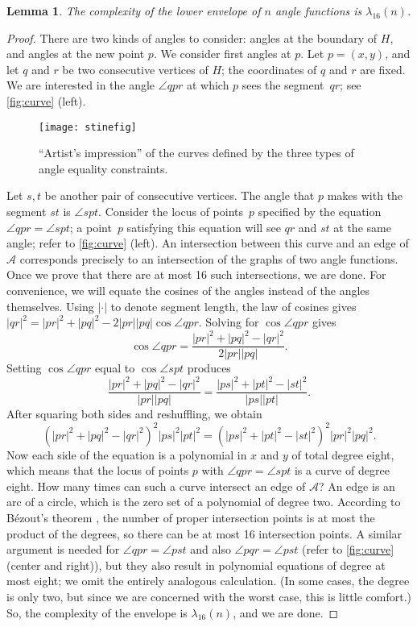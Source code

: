 \documentclass{cccg13}
\newtheorem{lemma}{Lemma}
\newcommand\arr{\mathcal A}
\begin{document}
\begin{lemma} The complexity of the lower envelope of $n$ angle functions is
$\lambda_{16}(n)$. \end{lemma}
\begin{proof} There are two kinds of angles to consider: angles at the boundary of $H$, and angles at the new point $p$.  We consider first angles at $p$.  Let $p=(x,y)$, and let $q$ and $r$ be two consecutive vertices of $H$; the coordinates of $q$ and $r$ are fixed.  We are interested in the angle $\angle qpr$ at which $p$ sees the segment~$qr$; see \autoref{fig:curve} (left). 
\begin{figure}
  \centering
  \texttt{[image: stinefig]}
  \caption{``Artist's impression'' of the curves defined by the three types of angle equality constraints.}
  \label{fig:curve}
\end{figure}
Let $s,t$ be another pair of consecutive vertices.  The angle that $p$ makes with the segment $st$ is $\angle spt$.  Consider the locus of points~$p$ specified by the equation
$\angle qpr = \angle spt$; a point~$p$ satisfying this equation will see $qr$ and $st$ at the same angle; refer to \autoref{fig:curve} (left).  An intersection between this curve and an edge of $\arr$ corresponds precisely to an intersection of the graphs of two angle functions.  Once we prove that there are at most 16 such intersections, we are done.  For convenience, we will equate the cosines of the angles instead of the angles themselves.  Using $|\cdot|$ to denote segment length, the law of cosines gives
$|qr|^2 = |pr|^2 + |pq|^2 - 2|pr||pq|\cos\angle qpr$.  Solving for $\cos\angle qpr$ gives
\[\cos\angle qpr = \frac{|pr|^2 + |pq|^2 - |qr|^2}{2|pr||pq|}.\]
Setting $\cos\angle qpr$ equal to $\cos\angle spt$ produces
\[\frac{|pr|^2 + |pq|^2 - |qr|^2}{|pr||pq|} = \frac{|ps|^2 + |pt|^2 - |st|^2}{|ps||pt|}.\]
After squaring both sides and reshuffling, we obtain
\[(|pr|^2 + |pq|^2 - |qr|^2)^2 |ps|^2 |pt|^2 =(|ps|^2 + |pt|^2 - |st|^2)^2 |pr|^2 |pq|^2.\]
Now each side of the equation is a polynomial in $x$ and $y$ of total degree eight, which means that the locus of points $p$ with $\angle qpr = \angle spt$ is a curve of degree eight.  How many times can such a curve intersect an edge of $\arr$?  An edge is an arc of a circle, which is the zero set of a polynomial of degree two.  According to B\'ezout's  theorem \cite{bez}, the number of proper intersection points is at most the product of the degrees, so there can be at most 16 intersection points.  A similar argument is needed for $\angle qpr = \angle pst$ and also $\angle pqr = \angle pst$ (refer to \autoref{fig:curve} (center and right)), but they also result in polynomial equations of degree at most eight; we omit the entirely analogous calculation.  (In some cases, the degree is only two, but since we are concerned with the worst case, this is little comfort.)  So, the complexity of the envelope is $\lambda_{16}(n)$, and we are done.
\end{proof}
\end{document}
